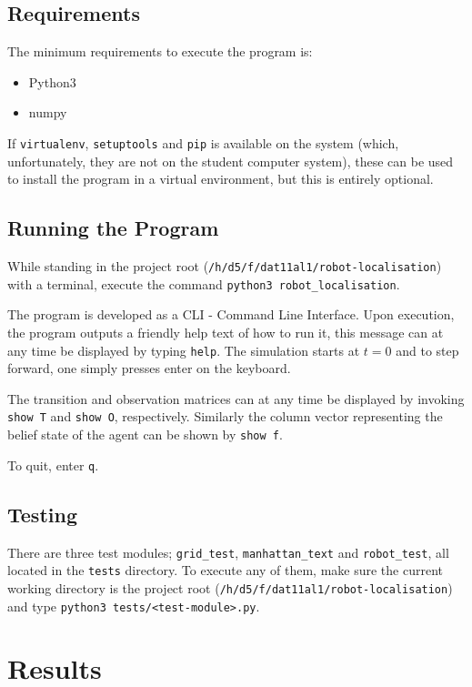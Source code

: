 \documentclass{article}
\begin{document}
\subsection{Requirements}
The minimum requirements to execute the program is:

\begin{itemize}
    \item Python3
    \item numpy
\end{itemize}
If \texttt{virtualenv}, \texttt{setuptools} and \texttt{pip} is available on the system (which, unfortunately, they are not on the student computer system), these can be used to install the program in a virtual environment, but this is entirely optional.

\subsection{Running the Program}
While standing in the project root (\texttt{/h/d5/f/dat11al1/robot-localisation}) with a terminal, execute the command \texttt{python3 robot\_localisation}.

The program is developed as a CLI - Command Line Interface. Upon execution, the program outputs a friendly help text of how to run it, this message can at any time be displayed by typing \texttt{help}. The simulation starts at $t = 0$ and to step forward, one simply presses enter on the keyboard.

The transition and observation matrices can at any time be displayed by invoking \texttt{show T} and \texttt{show O}, respectively. Similarly the column vector representing the belief state of the agent can be shown by \texttt{show f}.

To quit, enter \texttt{q}.

\subsection{Testing}
There are three test modules; \texttt{grid\_test}, \texttt{manhattan\_text} and \texttt{robot\_test}, all located in the \texttt{tests} directory. To execute any of them, make sure the current working directory is the project root (\texttt{/h/d5/f/dat11al1/robot-localisation}) and type \texttt{python3 tests/<test-module>.py}.
 
\section{Results}
\end{document}
